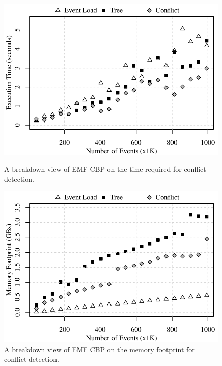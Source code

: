 \begin{figure}[]
  \centering
  \begin{minipage}[b]{0.490\textwidth}
    \includegraphics[width=\linewidth]{ecbp-conflict-time-events}
    \caption{A breakdown view of EMF CBP on the time required for conflict detection.}
    \label{fig:ecbp-conflict-time-events}    
  \end{minipage}
  \hfill
  \begin{minipage}[b]{0.490\textwidth}
    \includegraphics[width=\linewidth]{ecbp-conflict-memory-events}
    \caption{A breakdown view of EMF CBP on the memory footprint for conflict detection.}
    \label{fig:ecbp-conflict-memory-events}    
  \end{minipage}  
\end{figure}

